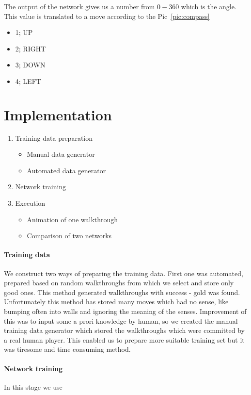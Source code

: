 \documentclass[a4paper]{article}
\begin{document}
	The output of the network gives us a number from $0-360$ which is the angle. This value
	is translated to a move according to the Pic~\ref{pic:compass}
	\begin{itemize}
		\item 1; UP
		\item 2; RIGHT
		\item 3; DOWN
		\item 4; LEFT
	\end{itemize}
	

\section{Implementation }
		\begin{enumerate}
		\item Training data preparation
			\begin{itemize}
				\item Manual data generator 
				\item Automated data generator
			\end{itemize}
		\item Network training 
		\item Execution
			\begin{itemize}
				\item Animation of one walkthrough
				\item Comparison of two networks 
			\end{itemize}
	\end{enumerate}
	
	\paragraph{Training data}
	We construct two ways of preparing the training data. First one was automated, prepared 
	based on random walkthroughs from which we select and store only good ones. This method
	 generated walkthroughs with success - gold was found. Unfortunately this method has stored 
	 many moves which had no sense, like bumping often into walls and ignoring the meaning 
	 of the senses.  
	 Improvement of this was to input some a prori knowledge by human, so we created the manual
	 training data generator which stored the walkthroughs which were committed by a real human player.
	 This enabled us to prepare more suitable training set but it was tiresome and time consuming method.
	 
	\paragraph{Network training}
	In this stage we use
\end{document}
